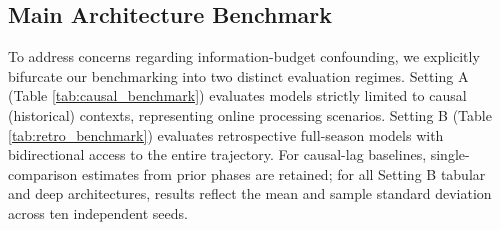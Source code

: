 \documentclass[runningheads]{llncs}
\begin{document}
\subsection{Main Architecture Benchmark}
To address concerns regarding information-budget confounding, we explicitly bifurcate our benchmarking into two distinct evaluation regimes. Setting A (Table \ref{tab:causal_benchmark}) evaluates models strictly limited to causal (historical) contexts, representing online processing scenarios. Setting B (Table \ref{tab:retro_benchmark}) evaluates retrospective full-season models with bidirectional access to the entire trajectory. For causal-lag baselines, single-comparison estimates from prior phases are retained; for all Setting B tabular and deep architectures, results reflect the mean and sample standard deviation across ten independent seeds.

\begin{table}[h!]
\centering
\caption{Setting A Benchmark: Causal / Online Models (Local Context) on 399 test seasons.}
\label{tab:causal_benchmark}
\end{table}

\begin{table}[h!]
\centering
\caption{Setting B Benchmark: Retrospective / Full-Season Models (Bidirectional Context) on 399 test seasons.}
\label{tab:retro_benchmark}
\end{table}
\end{document}
